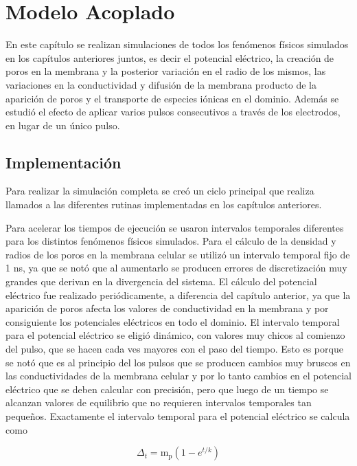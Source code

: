 \chapter{Modelo Acoplado} \label{chap:acoplado}

En este capítulo se realizan simulaciones de todos los fenómenos físicos simulados en los capítulos anteriores juntos, es decir el potencial eléctrico, la creación de poros en la membrana y la posterior variación en el radio de los mismos, las variaciones en la conductividad y difusión de la membrana producto de la aparición de poros y el transporte de especies iónicas en el dominio. Además se estudió el efecto de aplicar varios pulsos consecutivos a través de los electrodos, en lugar de un único pulso.

\section{Implementación}
Para realizar la simulación completa se creó un ciclo principal que realiza llamados a las diferentes rutinas implementadas en los capítulos anteriores.

Para acelerar los tiempos de ejecución se usaron intervalos temporales diferentes para los distintos fenómenos físicos simulados. Para el cálculo de la densidad y radios de los poros en la membrana celular se utilizó un intervalo temporal fijo de 1 \si{\nano\second}, ya que se notó que al aumentarlo se producen errores de discretización muy grandes que derivan en la divergencia del sistema. El cálculo del potencial eléctrico fue realizado periódicamente, a diferencia del capítulo anterior, ya que la aparición de poros afecta los valores de conductividad en la membrana y por consiguiente los potenciales eléctricos en todo el dominio. El intervalo temporal para el potencial eléctrico se eligió dinámico, con valores muy chicos al comienzo del pulso, que se hacen cada ves mayores con el paso del tiempo. Esto es porque se notó que es al principio del los pulsos que se producen cambios muy bruscos en las conductividades de la membrana celular y por lo tanto cambios en el potencial eléctrico que se deben calcular con precisión, pero que luego de un tiempo se alcanzan valores de equilibrio que no requieren intervalos temporales tan pequeños. Exactamente el intervalo temporal para el potencial eléctrico se calcula como

\begin{equation}
	\Delta_t = \mathrm{m_p} \left( 1 - e^{t/k} \right)
\end{equation}

